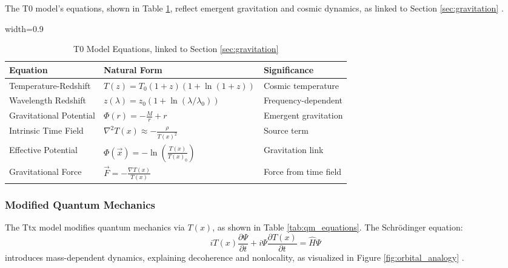 \documentclass[12pt,a4paper]{article}
\newcommand{\Tfield}{T(x)}
\newcommand{\tablescale}{0.9}
\begin{document}
	The T0 model’s equations, shown in Table \ref{tab:t0_equations}, reflect emergent gravitation and cosmic dynamics, as linked to Section \ref{sec:gravitation} \cite{pascher_emergente_2025}.
	
	\begin{table}[htbp]
		\centering
		\begin{adjustbox}{width=\tablescale\textwidth}
			\begin{tabular}{lll}
				\toprule
				\textbf{Equation} & \textbf{Natural Form} & \textbf{Significance} \\
				\midrule
				Temperature-Redshift & \(T(z) = T_0 (1+z)(1+\ln(1+z))\) & Cosmic temperature \\
				Wavelength Redshift & \(z(\lambda) = z_0 (1+\ln(\lambda/\lambda_0))\) & Frequency-dependent \\
				Gravitational Potential & \(\Phi(r) = -\frac{M}{r} + r\) & Emergent gravitation \\
				Intrinsic Time Field & \(\nabla^2 \Tfield \approx -\frac{\rho}{\Tfield^2}\) & Source term \\
				Effective Potential & \(\Phi(\vec{x}) = -\ln\left(\frac{\Tfield}{\Tfield_0}\right)\) & Gravitation link \\
				Gravitational Force & \(\vec{F} = -\frac{\nabla \Tfield}{\Tfield}\) & Force from time field \\
				\bottomrule
			\end{tabular}
		\end{adjustbox}
		\caption{T0 Model Equations, linked to Section \ref{sec:gravitation}}
		\label{tab:t0_equations}
	\end{table}
	
	\subsubsection{Modified Quantum Mechanics}
	\label{subsec:quantum}
	
	The Ttx model modifies quantum mechanics via \(\Tfield\), as shown in Table \ref{tab:qm_equations}. The Schrödinger equation:
	\[
	i \Tfield \frac{\partial \Psi}{\partial t} + i \Psi \frac{\partial \Tfield}{\partial t} = \hat{H} \Psi
	\]
	introduces mass-dependent dynamics, explaining decoherence and nonlocality, as visualized in Figure \ref{fig:orbital_analogy} \cite{pascher_quantum_2025}.
	
\end{document}
